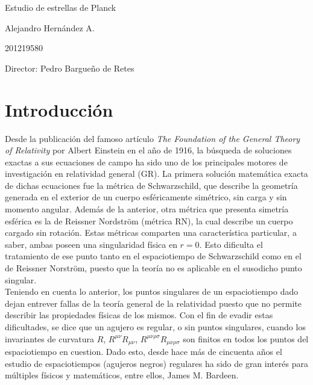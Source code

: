 \documentclass{article}
\numberwithin{equation}{section}
\theoremstyle{definition}
\begin{document}
\begin{center}
\Huge
Estudio de estrellas de Planck 

\vspace{3mm}
\Large Alejandro Hernández A.

\large
201219580


\vspace{2mm}
\Large
Director: Pedro Bargueño de Retes

\normalsize
\vspace{2mm}

\date{}
\end{center}


\normalsize
\section{Introducción}

Desde la publicación del famoso artículo \textit{The Foundation of the General Theory of Relativity} %
por Albert Einstein en el año de 1916, la búsqueda de soluciones exactas a sus ecuaciones de campo ha sido uno de los principales motores de investigación en relatividad general (GR). La primera solución matemática exacta de dichas ecuaciones fue la métrica de Schwarzschild, que describe la geometría generada en el exterior de un cuerpo esféricamente simétrico, sin carga y sin momento angular. Además de la anterior, otra métrica que presenta simetría esférica es la de Reissner Nordström (métrica RN), la cual describe un cuerpo cargado sin rotación. Estas métricas comparten una característica particular, a saber, ambas poseen una singularidad física en $r = 0$. Esto dificulta el tratamiento de ese punto tanto en el espaciotiempo de Schwarzschild como en el de Reissner Norström, puesto que la teoría no es aplicable en el susodicho punto singular.\\

Teniendo en cuenta lo anterior, los puntos singulares de un espaciotiempo dado dejan entrever fallas de la teoría general de la relatividad puesto que no permite describir las propiedades físicas de los mismos. Con el fin de evadir estas dificultades, se dice que un agujero es regular, o sin puntos singulares, cuando los invariantes de curvatura $R$, $R^{\mu \nu}R_{\mu \nu}$, $R^{\mu \nu \rho \sigma}R_{\mu \nu \rho \sigma}$ son finitos en todos los puntos del espaciotiempo en cuestion. Dado esto, desde hace más de cincuenta años el estudio de espaciotiempos (agujeros negros) regulares ha sido de gran interés para múltiples físicos y matemáticos, entre ellos, James M. Bardeen. \\
\end{document}
